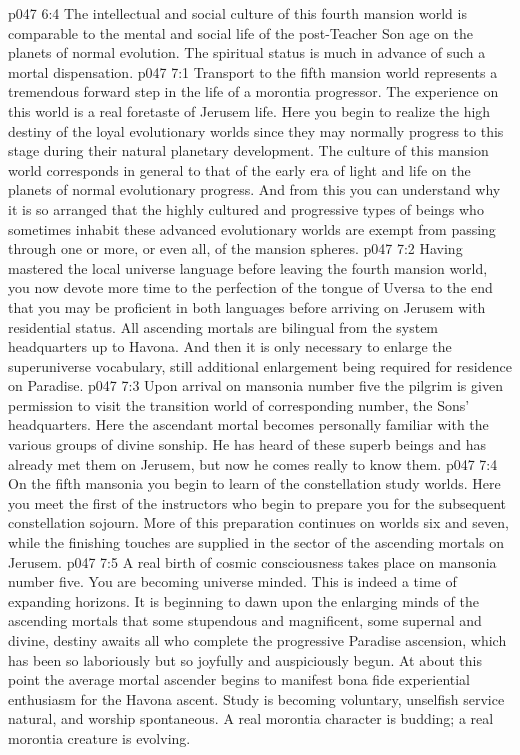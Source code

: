 \vs p047 6:4 The intellectual and social culture of this fourth mansion world is comparable to the mental and social life of the post\hyp{}Teacher Son age on the planets of normal evolution. The spiritual status is much in advance of such a mortal dispensation.
\vs p047 7:1 Transport to the fifth mansion world represents a tremendous forward step in the life of a morontia progressor. The experience on this world is a real foretaste of Jerusem life. Here you begin to realize the high destiny of the loyal evolutionary worlds since they may normally progress to this stage during their natural planetary development. The culture of this mansion world corresponds in general to that of the early era of light and life on the planets of normal evolutionary progress. And from this you can understand why it is so arranged that the highly cultured and progressive types of beings who sometimes inhabit these advanced evolutionary worlds are exempt from passing through one or more, or even all, of the mansion spheres.
\vs p047 7:2 Having mastered the local universe language before leaving the fourth mansion world, you now devote more time to the perfection of the tongue of Uversa to the end that you may be proficient in both languages before arriving on Jerusem with residential status. All ascending mortals are bilingual from the system headquarters up to Havona. And then it is only necessary to enlarge the superuniverse vocabulary, still additional enlargement being required for residence on Paradise.
\vs p047 7:3 Upon arrival on mansonia number five the pilgrim is given permission to visit the transition world of corresponding number, the Sons’ headquarters. Here the ascendant mortal becomes personally familiar with the various groups of divine sonship. He has heard of these superb beings and has already met them on Jerusem, but now he comes really to know them.
\vs p047 7:4 On the fifth mansonia you begin to learn of the constellation study worlds. Here you meet the first of the instructors who begin to prepare you for the subsequent constellation sojourn. More of this preparation continues on worlds six and seven, while the finishing touches are supplied in the sector of the ascending mortals on Jerusem.
\vs p047 7:5 A real birth of cosmic consciousness takes place on mansonia number five. You are becoming universe minded. This is indeed a time of expanding horizons. It is beginning to dawn upon the enlarging minds of the ascending mortals that some stupendous and magnificent, some supernal and divine, destiny awaits all who complete the progressive Paradise ascension, which has been so laboriously but so joyfully and auspiciously begun. At about this point the average mortal ascender begins to manifest bona fide experiential enthusiasm for the Havona ascent. Study is becoming voluntary, unselfish service natural, and worship spontaneous. A real morontia character is budding; a real morontia creature is evolving.
